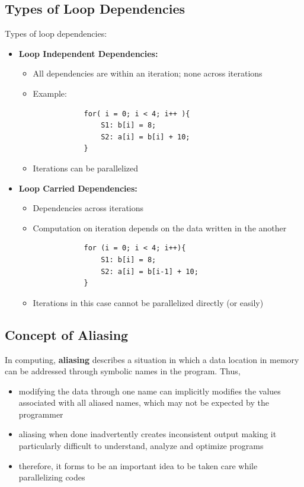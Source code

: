 \documentclass[12pt, a4paper]{report}
\begin{document}
\subsection{Types of Loop Dependencies}
Types of loop dependencies:
\begin{itemize}
    \item {\bfseries{Loop Independent Dependencies:}}
    \begin{itemize}
        \item All dependencies are within an iteration; none across iterations
        \item Example:
        \begin{verbatim}
            for( i = 0; i < 4; i++ ){
                S1: b[i] = 8;
                S2: a[i] = b[i] + 10;
            }
        \end{verbatim}
        \item Iterations can be parallelized
    \end{itemize}

    \item {\bfseries{Loop Carried Dependencies:}}
    \begin{itemize}
        \item Dependencies across iterations
        \item Computation on iteration depends on the data written in the another
        \begin{verbatim}
            for (i = 0; i < 4; i++){
                S1: b[i] = 8;
                S2: a[i] = b[i-1] + 10;
            }
        \end{verbatim}
        \item Iterations in this case cannot be parallelized directly (or easily)
    \end{itemize}
\end{itemize}

\subsection{Concept of Aliasing}
In computing, {\bfseries{aliasing}} describes a situation in which a data location in memory can be addressed through symbolic names in the program.
Thus, 
\begin{itemize}
    \item modifying the data through one name can implicitly modifies the values associated with all aliased names, which may not be expected by the programmer
    \item aliasing when done inadvertently creates inconsistent output making it particularly difficult to understand, analyze and optimize programs
    \item therefore, it forms to be an important idea to be taken care while parallelizing codes
\end{itemize}
\end{document}
